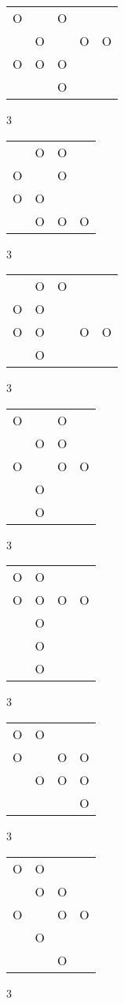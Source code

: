 \begin{tabular}{|m{0.2cm}m{0.2cm}m{0.2cm}m{0.2cm}m{0.2cm}|}\hline
O& &O& & \\
 &O& &O&O\\
O&O&O& & \\
 & &O& & \\
\hline\end{tabular}3
\begin{tabular}{|m{0.2cm}m{0.2cm}m{0.2cm}m{0.2cm}|}\hline
 &O&O& \\
O& &O& \\
O&O& & \\
 &O&O&O\\
\hline\end{tabular}3
\begin{tabular}{|m{0.2cm}m{0.2cm}m{0.2cm}m{0.2cm}m{0.2cm}|}\hline
 &O&O& & \\
O&O& & & \\
O&O& &O&O\\
 &O& & & \\
\hline\end{tabular}3
\begin{tabular}{|m{0.2cm}m{0.2cm}m{0.2cm}m{0.2cm}|}\hline
O& &O& \\
 &O&O& \\
O& &O&O\\
 &O& & \\
 &O& & \\
\hline\end{tabular}3
\begin{tabular}{|m{0.2cm}m{0.2cm}m{0.2cm}m{0.2cm}|}\hline
O&O& & \\
O&O&O&O\\
 &O& & \\
 &O& & \\
 &O& & \\
\hline\end{tabular}3
\begin{tabular}{|m{0.2cm}m{0.2cm}m{0.2cm}m{0.2cm}|}\hline
O&O& & \\
O& &O&O\\
 &O&O&O\\
 & & &O\\
\hline\end{tabular}3
\begin{tabular}{|m{0.2cm}m{0.2cm}m{0.2cm}m{0.2cm}|}\hline
O&O& & \\
 &O&O& \\
O& &O&O\\
 &O& & \\
 & &O& \\
\hline\end{tabular}3
